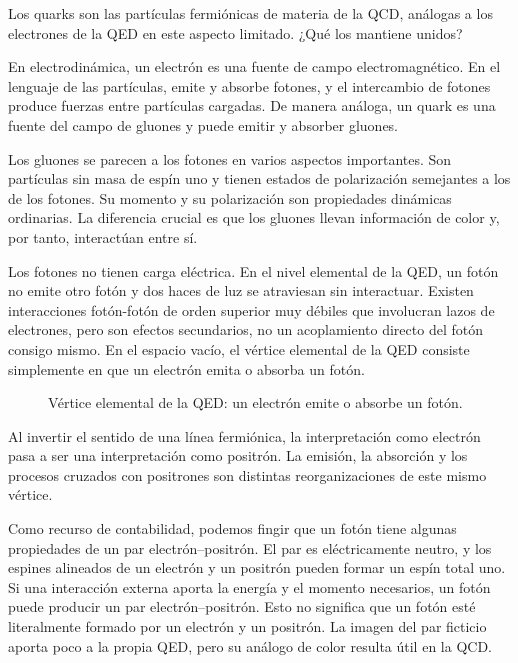 Los quarks son las partículas fermiónicas de materia de la QCD, análogas a los electrones de la QED en este aspecto limitado. ¿Qué los mantiene unidos?

En electrodinámica, un electrón es una fuente de campo electromagnético. En el lenguaje de las partículas, emite y absorbe fotones, y el intercambio de fotones produce fuerzas entre partículas cargadas. De manera análoga, un quark es una fuente del campo de gluones y puede emitir y absorber gluones.

Los gluones se parecen a los fotones en varios aspectos importantes. Son partículas sin masa de espín uno y tienen estados de polarización semejantes a los de los fotones. Su momento y su polarización son propiedades dinámicas ordinarias. La diferencia crucial es que los gluones llevan información de color y, por tanto, interactúan entre sí.

Los fotones no tienen carga eléctrica. En el nivel elemental de la QED, un fotón no emite otro fotón y dos haces de luz se atraviesan sin interactuar. Existen interacciones fotón-fotón de orden superior muy débiles que involucran lazos de electrones, pero son efectos secundarios, no un acoplamiento directo del fotón consigo mismo. En el espacio vacío, el vértice elemental de la QED consiste simplemente en que un electrón emita o absorba un fotón.

\begin{figure}[h]
\centering
{}
\caption{Vértice elemental de la QED: un electrón emite o absorbe un fotón.}
\end{figure}

Al invertir el sentido de una línea fermiónica, la interpretación como electrón pasa a ser una interpretación como positrón. La emisión, la absorción y los procesos cruzados con positrones son distintas reorganizaciones de este mismo vértice.

Como recurso de contabilidad, podemos fingir que un fotón tiene algunas propiedades de un par electrón--positrón. El par es eléctricamente neutro, y los espines alineados de un electrón y un positrón pueden formar un espín total uno. Si una interacción externa aporta la energía y el momento necesarios, un fotón puede producir un par electrón--positrón. Esto no significa que un fotón esté literalmente formado por un electrón y un positrón. La imagen del par ficticio aporta poco a la propia QED, pero su análogo de color resulta útil en la QCD.

